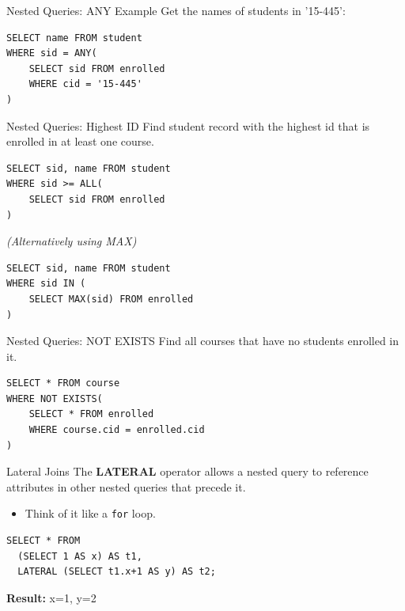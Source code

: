 \documentclass[aspectratio=169]{beamer}
\begin{document}
\begin{frame}[fragile]{Nested Queries: ANY Example}
    Get the names of students in '15-445':
    
    \begin{lstlisting}
SELECT name FROM student
WHERE sid = ANY(
    SELECT sid FROM enrolled
    WHERE cid = '15-445'
)
    \end{lstlisting}
\end{frame}

\begin{frame}[fragile]{Nested Queries: Highest ID}
    Find student record with the highest id that is enrolled in at least one course.
    
    \begin{lstlisting}
SELECT sid, name FROM student
WHERE sid >= ALL(
    SELECT sid FROM enrolled
)
    \end{lstlisting}
    
    \textit{(Alternatively using MAX)}
    \begin{lstlisting}
SELECT sid, name FROM student
WHERE sid IN (
    SELECT MAX(sid) FROM enrolled
)
    \end{lstlisting}
\end{frame}

\begin{frame}[fragile]{Nested Queries: NOT EXISTS}
    Find all courses that have no students enrolled in it.
    
    \begin{lstlisting}
SELECT * FROM course
WHERE NOT EXISTS(
    SELECT * FROM enrolled
    WHERE course.cid = enrolled.cid
)
    \end{lstlisting}
\end{frame}

\begin{frame}[fragile]{Lateral Joins}
    The \textbf{LATERAL} operator allows a nested query to reference attributes in other nested queries that precede it.
    
    \begin{itemize}
        \item Think of it like a \texttt{for} loop.
    \end{itemize}
    
    \begin{lstlisting}
SELECT * FROM
  (SELECT 1 AS x) AS t1,
  LATERAL (SELECT t1.x+1 AS y) AS t2;
    \end{lstlisting}
    \textbf{Result:} x=1, y=2
\end{frame}
\end{document}
